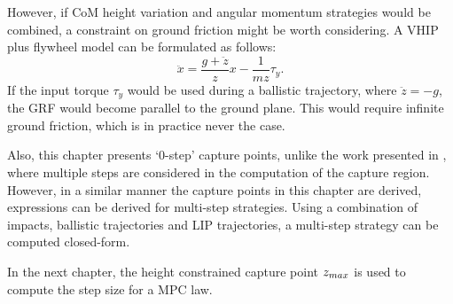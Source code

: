 However, if \ac{CoM} height variation and angular momentum strategies would be combined, a constraint on ground friction might be worth considering.  A \ac{VHIP} plus flywheel model can be formulated as follows:
\begin{equation}
 \ddot{x} = \frac{g+\ddot{z}}{z}x - \frac{1}{mz}\tau_y.
\end{equation}
If the input torque $\tau_y$ would be used during a ballistic trajectory, where $\ddot{z}=-g$, the \ac{GRF} would become parallel to the ground plane. This would require infinite ground friction, which is in practice never the case.

Also, this chapter presents `0-step' capture points, unlike the work presented in \cite{koolen2012capturability, gao2017increase}, where multiple steps are considered in the computation of the capture region. However, in a similar manner the capture points in this chapter are derived, expressions can be derived for multi-step strategies. Using a combination of impacts, ballistic trajectories and \ac{LIP} trajectories, a multi-step strategy can be computed closed-form.

In the next chapter, the height constrained capture point $z_{max}$ is used to compute the step size for a \ac{MPC} law.